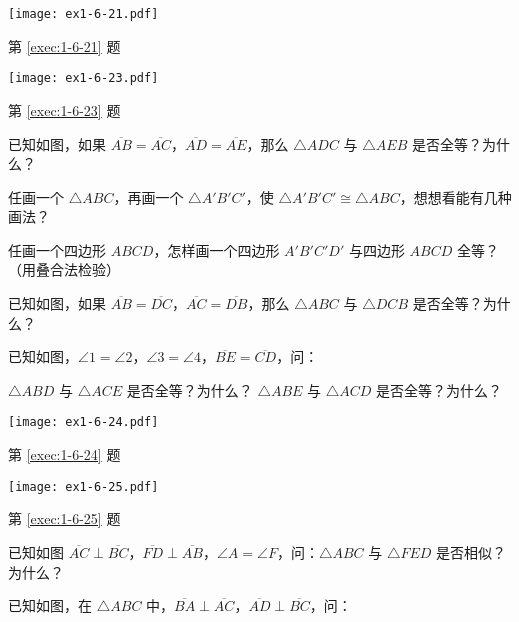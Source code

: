 \begin{Exercise}[复习题]
\begin{question}
\begin{figurehere}
		\begin{minipage}[b]{0.48\linewidth}
			\centering
			\texttt{[image: ex1-6-21.pdf]}
			\caption*{第 \ref{exec:1-6-21} 题}
		\end{minipage}
		\begin{minipage}[b]{0.48\linewidth}
			\centering
			\texttt{[image: ex1-6-23.pdf]}
			\caption*{第 \ref{exec:1-6-23} 题}
		\end{minipage}
	\end{figurehere}
	\item\label{exec:1-6-23} 已知如图，如果 $\overline{AB}=\overline{AC}$，$\overline{AD}=\overline{AE}$，那么 $\triangle ADC$ 与 $\triangle AEB$ 是否全等？为什么？
	\item 任画一个 $\triangle ABC$，再画一个 $\triangle A'B'C'$，使 $\triangle A'B'C'\cong \triangle ABC$，想想看能有几种画法？
	\item 任画一个四边形 $ABCD$，怎样画一个四边形 $A'B'C'D'$ 与四边形 $ABCD$ 全等？（用叠合法检验）
	\item\label{exec:1-6-24} 已知如图，如果 $\overline{AB}=\overline{DC}$，$\overline{AC}=\overline{DB}$，那么 $\triangle ABC$ 与 $\triangle DCB$ 是否全等？为什么？
	\item\label{exec:1-6-25} 已知如图，$\angle 1=\angle 2$，$\angle 3=\angle 4$，$\overline{BE}=\overline{CD}$，问：
	\begin{tasks}
		\task $\triangle ABD$ 与 $\triangle ACE$ 是否全等？为什么？
		\task $\triangle ABE$ 与 $\triangle ACD$ 是否全等？为什么？
	\end{tasks}
	\begin{figurehere}
		\begin{minipage}[b]{0.48\linewidth}
			\centering
			\texttt{[image: ex1-6-24.pdf]}
			\caption*{第 \ref{exec:1-6-24} 题}
		\end{minipage}
		\begin{minipage}[b]{0.48\linewidth}
			\centering
			\texttt{[image: ex1-6-25.pdf]}
			\caption*{第 \ref{exec:1-6-25} 题}
		\end{minipage}
	\end{figurehere}
	\item\label{exec:1-6-28} 已知如图 $\overline{AC}\perp \overline{BC}$，$\overline{FD}\perp \overline{AB}$，$\angle A=\angle F$，问：$\triangle ABC$ 与 $\triangle FED$ 是否相似？为什么？
	\item\label{exec:1-6-29} 已知如图，在 $\triangle ABC$ 中，$\overline{BA}\perp \overline{AC}$，$\overline{AD}\perp \overline{BC}$，问：
	\begin{tasks}

\end{tasks}
\end{question}
\end{Exercise}

